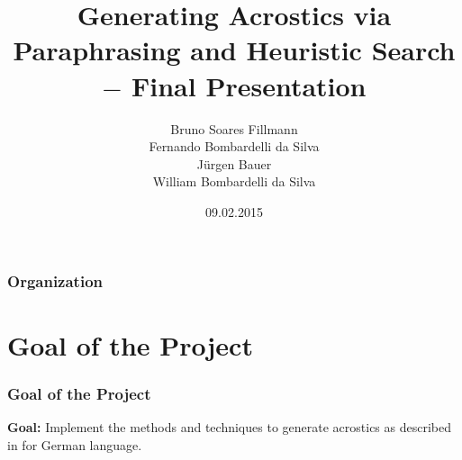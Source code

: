\documentclass{beamer}
\title[Generating Acrostics via Paraphrasing and Heuristic Search]{Generating Acrostics via Paraphrasing and Heuristic Search $-$ Final Presentation} %
\author[Bruno, Fernando, Jürgen, William]{Bruno Soares Fillmann\\
Fernando Bombardelli da Silva\\
Jürgen Bauer\\
William Bombardelli da Silva
} %
\institute[TU Berlin] %
{
Technische Universität Berlin \\ %
Datenbanksysteme und Informationsmanagement \\
DBPRO – Database Projects (WS 2014/2015) \\
\medskip
}
\date{09.02.2015} %
\begin{document}
\begin{frame}
\titlepage %
\end{frame}

\begin{frame}
\frametitle{Organization} %
\tableofcontents %
\end{frame}


\section{Goal of the Project} %

\begin{frame}
\frametitle{Goal of the Project}
\textbf{Goal:} Implement the methods and techniques to generate acrostics as described in 	\cite{Stein} for German language.
	

 

	
	
	
	
\end{frame}
\end{document}
